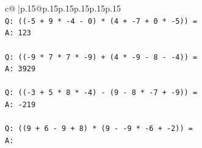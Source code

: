 \documentclass{article}
\begin{document}
{\begin{supertabular}{c@{$\;$}|p{.15\linewidth}@{}p{.15\linewidth}p{.15\linewidth}p{.15\linewidth}p{.15\linewidth}p{.15\linewidth}}
{{{\\ 
\texttt{Q: (({-}5 + 9 * {-}4 {-} 0) * (4 + {-}7 + 0 * {-}5)) =} \\
\texttt{A: 123} \\
\\ 
\texttt{Q: (({-}9 * 7 * 7 * {-}9) + (4 * {-}9 {-} 8 {-} {-}4)) =} \\
\texttt{A: 3929} \\
\\ 
\texttt{Q: (({-}3 + 5 * 8 * {-}4) {-} (9 {-} 8 * {-}7 + {-}9)) =} \\
\texttt{A: {-}219} \\
\\ 
\texttt{Q: ((9 + 6 {-} 9 + 8) * (9 {-} {-}9 * {-}6 + {-}2)) =} \\
\texttt{A:} \\
            }
        }
    }
     \\ \\


\end{supertabular}}
\end{document}
